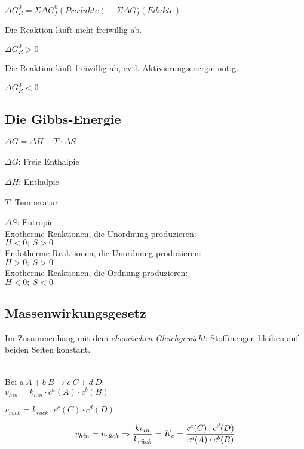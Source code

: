 {\large
	$\Delta G^0_R = \Sigma \Delta G^0_f (Produkte) - \Sigma \Delta G^0_f (Edukte)$
}
	
\begin{definition}
	Die Reaktion läuft nicht freiwillig ab.
	
	$\Delta G^0_R > 0$
\end{definition}

\begin{definition}
	Die Reaktion läuft freiwillig ab, evtl. Aktivierungsenergie nötig.
	
	$\Delta G^0_R < 0$
\end{definition}

\subsection{Die Gibbs-Energie}

{\large
	$\Delta G = \Delta H - T\cdot \Delta S$
}
\\ \\
$\Delta G$: Freie Enthalpie

$\Delta H$: Enthalpie

$T$: Temperatur

$\Delta S$: Entropie \\

Exotherme Reaktionen, die Unordnung produzieren: \\ $H<0; \ S>0$
\\

Endotherme Reaktionen, die Unordnung produzieren: \\ $H>0;\ S>0$
\\

Exotherme Reaktionen, die Ordnung produzieren: \\ $H<0;\ S<0$

\subsection{Massenwirkungsgesetz}
\label{mwg}

Im Zusammenhang mit dem \textit{chemischen Gleichgewicht}: Stoffmengen bleiben auf beiden Seiten konstant. \\ \\
{\large
	Bei $a \ A + b\ B \rightarrow c\ C + d\ D$: \\
	
	$v_{hin} = k_{hin} \cdot c^a(A) \cdot c^b(B)$
	
	$v_{r\ddot{u}ck} = k_{r\ddot{u}ck} \cdot c^c(C) \cdot c^d(D)$
	
	\begin{equation}
		v_{hin}=v_{r\ddot{u}ck} \\
		 \Rightarrow \frac{k_{hin}}{k_{r\ddot{u}ck}}=K_c=\frac{c^c(C) \cdot c^d(D)}{c^a(A) \cdot c^b(B)}
	\end{equation}
	
}


